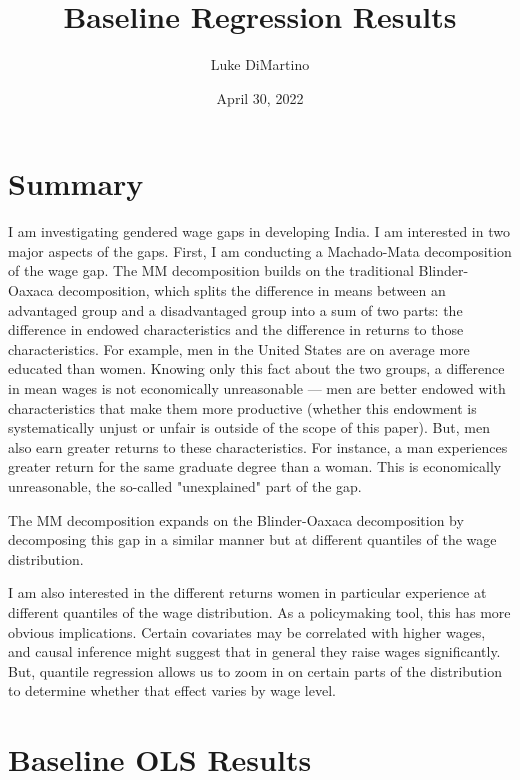 \documentclass[12pt]{article}
\title{Baseline Regression Results}
\author{Luke DiMartino}
\date{April 30, 2022}
\begin{document}
\maketitle

\setcounter{table}{0}
\renewcommand{\tablename}{Appendix Table}
\renewcommand{\figurename}{Appendix Figure}
\renewcommand{\thetable}{A\arabic{table}}
\setcounter{figure}{0}
\renewcommand{\thefigure}{A\arabic{figure}}


\section{Summary}

I am investigating gendered wage gaps in developing India. I am interested in two major aspects of the gaps. First, I am conducting a Machado-Mata decomposition of the wage gap. The MM decomposition builds on the traditional Blinder-Oaxaca decomposition, which splits the difference in means between an advantaged group and a disadvantaged group into a sum of two parts: the difference in endowed characteristics and the difference in returns to those characteristics. For example, men in the United States are on average more educated than women. Knowing only this fact about the two groups, a difference in mean wages is not economically unreasonable --- men are better endowed with characteristics that make them more productive (whether this endowment is systematically unjust or unfair is outside of the scope of this paper). But, men also earn greater returns to these characteristics. For instance, a man experiences greater return for the same graduate degree than a woman. This is economically unreasonable, the so-called "unexplained" part of the gap.

The MM decomposition expands on the Blinder-Oaxaca decomposition by decomposing this gap in a similar manner but at different quantiles of the wage distribution.

I am also interested in the different returns women in particular experience at different quantiles of the wage distribution. As a policymaking tool, this has more obvious implications. Certain covariates may be correlated with higher wages, and causal inference might suggest that in general they raise wages significantly. But, quantile regression allows us to zoom in on certain parts of the distribution to determine whether that effect varies by wage level.


\newpage 

\section{Baseline OLS Results}
\end{document}

